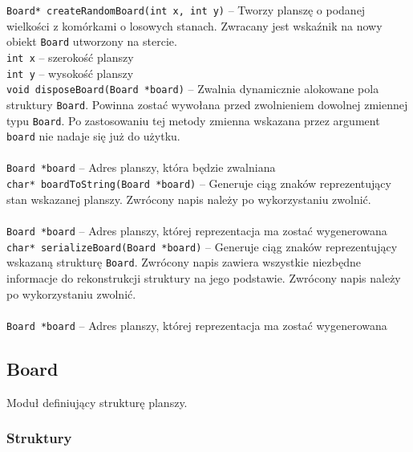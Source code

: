 \documentclass{article}
\begin{document}
\texttt{Board* createRandomBoard(int x, int y)} -- Tworzy planszę o podanej wielkości z komórkami o losowych stanach. Zwracany jest wskaźnik na nowy obiekt \texttt{Board} utworzony na stercie. \\
\hspace*{10mm}\texttt{int x} -- szerokość planszy\\
\hspace*{10mm}\texttt{int y} -- wysokość planszy\\

\vspace*{8mm}
\noindent{}\texttt{void disposeBoard(Board *board)} -- Zwalnia dynamicznie alokowane pola struktury \texttt{Board}. Powinna zostać wywołana przed zwolnieniem dowolnej zmiennej typu \texttt{Board}. Po zastosowaniu tej metody zmienna wskazana przez argument \texttt{board} nie nadaje się już do użytku. \\ \\
\hspace*{10mm}\texttt{Board *board} -- Adres planszy, która będzie zwalniana\\

\vspace*{8mm}
\noindent{}\texttt{char* boardToString(Board *board)} -- Generuje ciąg znaków reprezentujący stan wskazanej planszy. Zwrócony napis należy po wykorzystaniu zwolnić. \\ \\
\hspace*{10mm}\texttt{Board *board} -- Adres planszy, której reprezentacja ma zostać wygenerowana\\

\vspace*{8mm}
\noindent{}\texttt{char* serializeBoard(Board *board)} -- Generuje ciąg znaków reprezentujący wskazaną strukturę \texttt{Board}. Zwrócony napis zawiera wszystkie niezbędne informacje do rekonstrukcji struktury na jego podstawie. Zwrócony napis należy po wykorzystaniu zwolnić. \\ \\
\hspace*{10mm}\texttt{Board *board} -- Adres planszy, której reprezentacja ma zostać wygenerowana

\subsection{Board}
Moduł definiujący strukturę planszy.

\subsubsection{Struktury}
\end{document}
